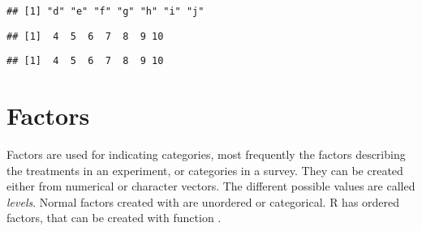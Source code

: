 \documentclass[paper=a4,10pt,div=17,headsepline,BCOR=12mm,twoside,open=right]{scrbook}\usepackage{knitr}
\begin{document}
\begin{knitrout}
\begin{kframe}
\begin{alltt}
 \hlkwb{<-}  \hlopt{>} \hlstd{)}
\end{alltt}
\begin{verbatim}
## [1] "d" "e" "f" "g" "h" "i" "j"
\end{verbatim}
\begin{alltt}
 \hlkwb{<-} \hlopt{:}
\end{alltt}
\begin{verbatim}
## [1]  4  5  6  7  8  9 10
\end{verbatim}
\begin{alltt}
\end{alltt}
\begin{verbatim}
## [1]  4  5  6  7  8  9 10
\end{verbatim}
\end{kframe}
\end{knitrout}

\section{Factors}

Factors are used for indicating categories, most frequently the factors describing the treatments in an experiment, or categories in a survey. They can be created either from numerical or character vectors. The different possible values are called \emph{levels}. Normal factors created with  are unordered or categorical. R has ordered factors, that can be created with function .

\begin{knitrout}\footnotesize
{}\color{fgcolor}\begin{kframe}
\begin{alltt}
 \hlkwb{<-} \hlstd{(}\hlstd{,} \hlstd{,} \hlstd{,} \hlstd{,} \hlstd{,} \hlstd{)}
 \hlkwb{<-} 
 \hlkwb{<-}  \hlstd{=}\hlstd{(}\hlstd{,} \hlstd{))}
\end{alltt}
\end{kframe}
\end{knitrout}
\end{document}
